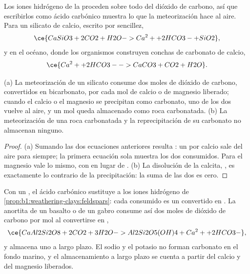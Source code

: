 Los iones hidrógeno de la  proceden sobre todo del dióxido de carbono, así que escribirlos como ácido carbónico muestra lo que la
meteorización hace al aire. Para un silicato de calcio, escrito  por sencillez,
\[
  \ce{CaSiO3 + 2 CO2 + H2O -> Ca^2+ + 2 HCO3- + SiO2},
\]
y en el océano, donde los organismos construyen conchas de carbonato de calcio,
\[
  \ce{Ca^2+ + 2 HCO3- -> CaCO3 + CO2 + H2O}.
\]

\begin{proposition}\label{prop:b1:weathering-clays:co2}
(a) La meteorización de un silicato consume dos moles de dióxido de carbono, convertidos en bicarbonato, por cada mol de calcio o de magnesio
liberado; cuando el calcio o el magnesio se precipitan como carbonato, uno de los dos vuelve al aire, y un mol queda almacenado como roca carbonatada.
(b) La meteorización de una roca carbonatada y la reprecipitación de su carbonato no almacenan ninguno.
\end{proposition}

\begin{proof}
(a) Sumando las dos ecuaciones anteriores resulta :
un  por calcio sale del aire para siempre; la primera ecuación sola muestra los dos consumidos. Para el magnesio vale lo mismo, con  en lugar de
. (b) La disolución de la calcita, , es exactamente lo contrario de la precipitación: la suma de las dos es cero.
\end{proof}

Con un , el ácido carbónico sustituye a los iones hidrógeno de
\cref{prop:b1:weathering-clays:feldspars}: cada  consumido es un  convertido en . La anortita de un basalto o de un gabro
consume así dos moles de dióxido de carbono por mol al convertirse en ,
\[
  \ce{CaAl2Si2O8 + 2 CO2 + 3 H2O -> Al2Si2O5(OH)4 + Ca^2+ + 2 HCO3-},
\]
y almacena uno a largo plazo. El sodio y el potasio no forman carbonato en el fondo marino, y el almacenamiento a largo plazo se cuenta a partir del
calcio y del magnesio liberados.

